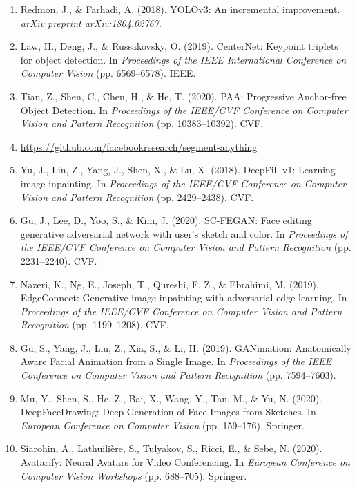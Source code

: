 \documentclass[12pt]{report}
\begin{document}
\begin{enumerate}
    \item Redmon, J., \& Farhadi, A. (2018). YOLOv3: An incremental improvement. \textit{arXiv preprint arXiv:1804.02767}.
    
    \item Law, H., Deng, J., \& Russakovsky, O. (2019). CenterNet: Keypoint triplets for object detection. In \textit{Proceedings of the IEEE International Conference on Computer Vision} (pp. 6569–6578). IEEE.
    
    \item Tian, Z., Shen, C., Chen, H., \& He, T. (2020). PAA: Progressive Anchor-free Object Detection. In \textit{Proceedings of the IEEE/CVF Conference on Computer Vision and Pattern Recognition} (pp. 10383–10392). CVF.
    
    \item \url{https://github.com/facebookresearch/segment-anything}
    
    \item Yu, J., Lin, Z., Yang, J., Shen, X., \& Lu, X. (2018). DeepFill v1: Learning image inpainting. In \textit{Proceedings of the IEEE/CVF Conference on Computer Vision and Pattern Recognition} (pp. 2429–2438). CVF.
    
    \item Gu, J., Lee, D., Yoo, S., \& Kim, J. (2020). SC-FEGAN: Face editing generative adversarial network with user's sketch and color. In \textit{Proceedings of the IEEE/CVF Conference on Computer Vision and Pattern Recognition} (pp. 2231–2240). CVF.
    
    \item Nazeri, K., Ng, E., Joseph, T., Qureshi, F. Z., \& Ebrahimi, M. (2019). EdgeConnect: Generative image inpainting with adversarial edge learning. In \textit{Proceedings of the IEEE/CVF Conference on Computer Vision and Pattern Recognition} (pp. 1199–1208). CVF.
    
    \item Gu, S., Yang, J., Liu, Z., Xia, S., \& Li, H. (2019). GANimation: Anatomically Aware Facial Animation from a Single Image. In \textit{Proceedings of the IEEE Conference on Computer Vision and Pattern Recognition} (pp. 7594–7603).
    
    \item Mu, Y., Shen, S., He, Z., Bai, X., Wang, Y., Tan, M., \& Yu, N. (2020). DeepFaceDrawing: Deep Generation of Face Images from Sketches. In \textit{European Conference on Computer Vision} (pp. 159–176). Springer.
    
    \item Siarohin, A., Lathuilière, S., Tulyakov, S., Ricci, E., \& Sebe, N. (2020). Avatarify: Neural Avatars for Video Conferencing. In \textit{European Conference on Computer Vision Workshops} (pp. 688–705). Springer.
    

\end{enumerate}
\end{document}
